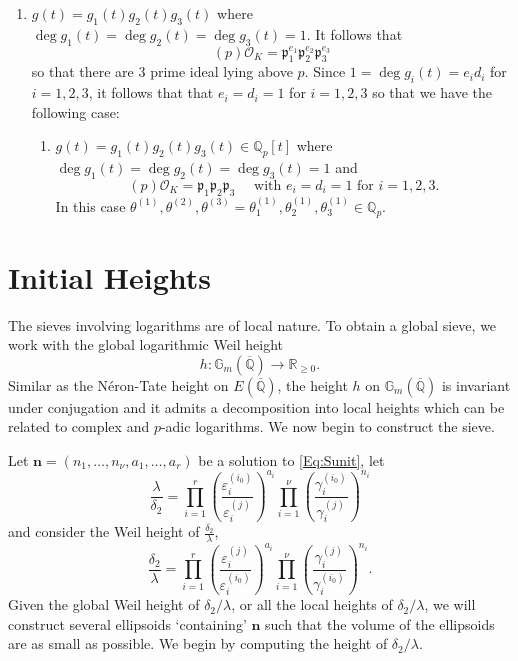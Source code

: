 \begin{enumerate}
\item $g(t) = g_1(t)g_2(t)g_3(t)$ where $\deg{g_1(t)} = \deg{g_2(t)} = \deg{g_3(t)} = 1$. It follows that 
\[(p)\mathcal{O}_K = \mathfrak{p}_1^{e_1}\mathfrak{p}_2^{e_2}\mathfrak{p}_3^{e_3}\]
so that there are $3$ prime ideal lying above $p$. Since $1 = \deg{g_i(t)} = e_id_i$ for $i = 1, 2,3$, it follows that that $e_i = d_i = 1$ for $i = 1,2,3$ so that we have the following case:

\begin{enumerate}
\item $g(t) = g_1(t)g_2(t)g_3(t) \in \mathbb{Q}_p[t]$ where $\deg{g_1(t)} = \deg{g_2(t)} = \deg{g_3(t)} = 1$ and 
\[(p)\mathcal{O}_K = \mathfrak{p}_1 \mathfrak{p}_2\mathfrak{p}_3  \quad \text{ with } 
	e_i = d_i = 1 \text{ for } i = 1,2,3.\]
In this case $\theta^{(1)}, \theta^{(2)}, \theta^{(3)} = \theta_1^{(1)}, \theta_2^{(1)}, \theta_3^{(1)} \in \mathbb{Q}_p$.
\end{enumerate}
\end{enumerate}

\section{Initial Heights}

The sieves involving logarithms are of local nature. To obtain a global sieve, we work with the global logarithmic Weil height 
\[h:\mathbb{G}_m(\overline{\mathbb{Q}})\to\mathbb{R}_{\geq 0}.\]
Similar as the N\'eron-Tate height on $E(\overline{\mathbb{Q}})$, the height  $h$ on $\mathbb{G}_m(\overline{\mathbb{Q}})$ is invariant under conjugation and it admits a decomposition into local heights which can be related to complex and $p$-adic logarithms. We now begin to construct the sieve.


Let $\mathbf{n} = (n_1, \dots, n_{\nu}, a_1, \dots, a_r)$ be a solution to \eqref{Eq:Sunit}, let
\[\frac{\lambda}{\delta_2}= \prod_{i = 1}^{r}\left( \frac{\varepsilon_i^{(i_0)}}{\varepsilon_i^{(j)}}\right)^{a_i} \prod_{i = 1}^{\nu} \left( \frac{\gamma_i^{(i_0)}}{\gamma_i^{(j)}}\right)^{n_i}\]
and consider the Weil height of $\frac{\delta_2}{\lambda}$, 
\[\frac{\delta_2}{\lambda}= \prod_{i = 1}^{r}\left( \frac{\varepsilon_i^{(j)}}{\varepsilon_i^{(i_0)}}\right)^{a_i} \prod_{i = 1}^{\nu} \left( \frac{\gamma_i^{(j)}}{\gamma_i^{(i_0)}}\right)^{n_i}.\]
Given the global Weil height of $\delta_2/\lambda$, or all the local heights of $\delta_2/\lambda$, we will construct several ellipsoids `containing' $\mathbf{n}$ such that the volume of the ellipsoids are as small as possible. We begin by computing the height of $\delta_2/\lambda$. 


